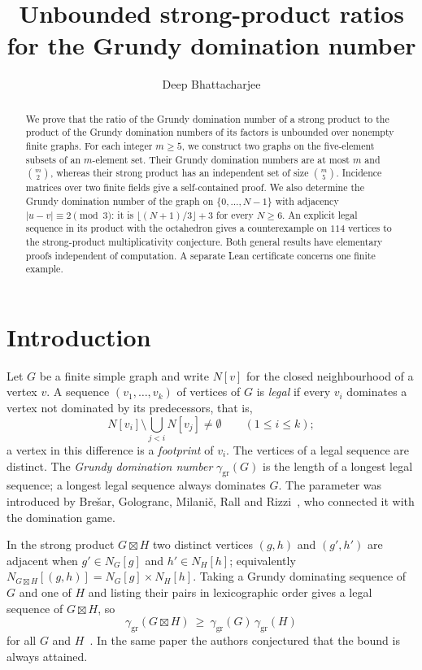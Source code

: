\documentclass[screen]{aomart}
\title[Unbounded strong-product ratios]{Unbounded strong-product ratios for the Grundy domination number}
\author{Deep Bhattacharjee}
\theoremstyle{definition}
\theoremstyle{remark}
\numberwithin{equation}{section}
\newcommand{\ggr}{\gamma_{\mathrm{gr}}}
\newcommand{\sprod}{\boxtimes}
\begin{document}
\begin{abstract}
We prove that the ratio of the Grundy domination number of a strong product to the product of the Grundy domination numbers of its factors is unbounded over nonempty finite graphs. For each integer $m\ge5$, we construct two graphs on the five-element subsets of an $m$-element set. Their Grundy domination numbers are at most $m$ and $\binom m2$, whereas their strong product has an independent set of size $\binom m5$. Incidence matrices over two finite fields give a self-contained proof. We also determine the Grundy domination number of the graph on $\{0,\ldots,N-1\}$ with adjacency $|u-v|\equiv2\pmod3$: it is $\lfloor(N+1)/3\rfloor+3$ for every $N\ge6$. An explicit legal sequence in its product with the octahedron gives a counterexample on $114$ vertices to the strong-product multiplicativity conjecture. Both general results have elementary proofs independent of computation. A separate Lean certificate concerns one finite example.
\end{abstract}
\maketitle

\section{Introduction}

Let $G$ be a finite simple graph and write $N[v]$ for the closed neighbourhood of a vertex $v$. A sequence $(v_1,\dots,v_k)$ of vertices of $G$ is \emph{legal} if every $v_i$ dominates a vertex not dominated by its predecessors, that is,
\[
  N[v_i]\setminus\bigcup_{j<i}N[v_j]\neq\emptyset\qquad(1\le i\le k);
\]
a vertex in this difference is a \emph{footprint} of $v_i$. The vertices of a legal sequence are distinct. The \emph{Grundy domination number} $\ggr(G)$ is the length of a longest legal sequence; a longest legal sequence always dominates $G$. The parameter was introduced by Bre\v{s}ar, Gologranc, Milani\v{c}, Rall and Rizzi~\cite{BGMRR}, who connected it with the domination game.

In the strong product $G\sprod H$ two distinct vertices $(g,h)$ and $(g',h')$ are adjacent when $g'\in N_G[g]$ and $h'\in N_H[h]$; equivalently $N_{G\sprod H}[(g,h)]=N_G[g]\times N_H[h]$. Taking a Grundy dominating sequence of $G$ and one of $H$ and listing their pairs in lexicographic order gives a legal sequence of $G\sprod H$, so
\begin{equation}\label{eq:lower}
  \ggr(G\sprod H)\ \ge\ \ggr(G)\,\ggr(H)
\end{equation}
for all $G$ and $H$~\cite[Proposition~21]{BBG}. In the same paper the authors conjectured that the bound is always attained.
\end{document}
